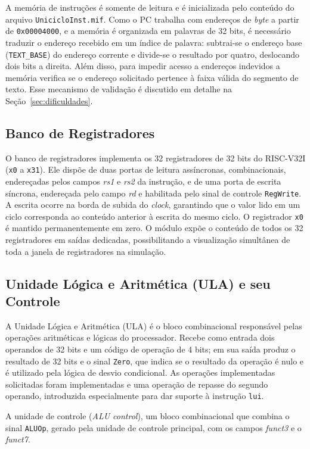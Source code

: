 \documentclass[conference]{IEEEtran}
\begin{document}
A memória de instruções é somente de leitura e é inicializada pelo conteúdo do arquivo \texttt{UnicicloInst.mif}. 
Como o PC trabalha com endereços de \textit{byte} a partir de
\texttt{0x00004000}, e a memória é organizada em palavras de 32 bits, é necessário traduzir o endereço
recebido em um índice de palavra: subtrai-se o endereço base (\texttt{TEXT\_BASE}) do endereço corrente e
divide-se o resultado por quatro, deslocando dois bits a direita. Além disso, para impedir 
acesso a endereços indevidos a memória verifica se o endereço solicitado pertence 
à faixa válida do segmento de texto. 
Esse mecanismo de validação é discutido em detalhe na Seção~\ref{sec:dificuldades}.

\subsection{Banco de Registradores}
O banco de registradores implementa os 32 registradores de 32 bits do RISC-V32I (\texttt{x0} a
\texttt{x31}). Ele dispõe de duas portas de leitura assíncronas, combinacionais, endereçadas pelos campos
\textit{rs1} e \textit{rs2} da instrução, e de uma porta de escrita síncrona, endereçada pelo campo
\textit{rd} e habilitada pelo sinal de controle \texttt{RegWrite}. A escrita ocorre na borda de subida do
\textit{clock}, garantindo que o valor lido em um ciclo corresponda ao conteúdo anterior à escrita do mesmo
ciclo. O registrador \texttt{x0} é mantido permanentemente em zero. 
O módulo expõe o conteúdo de todos os 32 registradores em saídas dedicadas, 
possibilitando a visualização simultânea de toda a janela de registradores na simulação.


\subsection{Unidade Lógica e Aritmética (ULA) e seu Controle}
A Unidade Lógica e Aritmética (ULA) é o bloco combinacional responsável pelas operações aritméticas e
lógicas do processador. Recebe como entrada dois operandos de 32 bits e um código de operação de 4 bits;
em sua saída produz o resultado de 32 bits e o sinal \texttt{Zero}, que indica se o resultado da operação é nulo e é
utilizado pela lógica de desvio condicional. As operações implementadas solicitadas foram implementadas e 
uma operação de repasse do segundo operando,
introduzida especialmente para dar suporte à instrução \texttt{lui}.

A unidade de controle (\textit{ALU control}), um bloco
combinacional que combina o sinal \texttt{ALUOp}, gerado pela unidade de controle principal, com os campos
\textit{funct3} e o \textit{funct7}.
\end{document}
